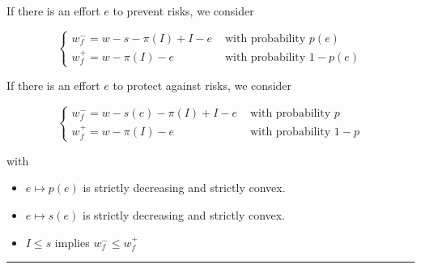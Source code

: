 \begin{f}
If there is an effort \(e\) to prevent risks, we consider

\[
\begin{cases}w_{f}^{-}=w-s-\pi(I)+I-e & \text { with probability } p(e) \\ w_{f}^{+}=w-\pi(I)-e & \text { with probability } 1-p(e)\end{cases}
\]

If there is an effort \(e\) to protect against risks, we consider

\[
\begin{cases}w_{f}^{-}=w-s(e)-\pi(I)+I-e & \text { with probability } p \\ w_{f}^{+}=w-\pi(I)-e & \text { with probability } 1-p\end{cases}
\]

with
\begin{itemize}
	\item \(e \mapsto p(e)\) is strictly decreasing and strictly convex.
	\item \(e \mapsto s(e)\) is strictly decreasing and strictly convex.\\
	\item \(I \leq s\) implies \(w_{f}^{-} \leq w_{f}^{+}\)
\end{itemize}

\end{f}
\hrule


